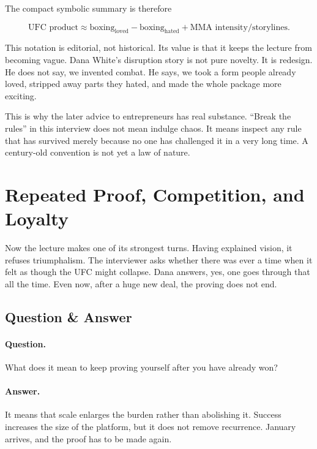 The compact symbolic summary is therefore

\begin{equation}
\text{UFC product}
\approx
\text{boxing}_{\mathrm{loved}}
-
\text{boxing}_{\mathrm{hated}}
+
\text{MMA intensity/storylines}.
\end{equation}

This notation is editorial, not historical. Its value is that it keeps the lecture from becoming vague. Dana White's disruption story is not pure novelty. It is redesign. He does not say, we invented combat. He says, we took a form people already loved, stripped away parts they hated, and made the whole package more exciting.

This is why the later advice to entrepreneurs has real substance. ``Break the rules'' in this interview does not mean indulge chaos. It means inspect any rule that has survived merely because no one has challenged it in a very long time. A century-old convention is not yet a law of nature.

\section{Repeated Proof, Competition, and Loyalty}

Now the lecture makes one of its strongest turns. Having explained vision, it refuses triumphalism. The interviewer asks whether there was ever a time when it felt as though the UFC might collapse. Dana answers, yes, one goes through that all the time. Even now, after a huge new deal, the proving does not end.

\subsection{Question \& Answer}

\paragraph{Question.}
What does it mean to keep proving yourself after you have already won?

\paragraph{Answer.}
It means that scale enlarges the burden rather than abolishing it. Success increases the size of the platform, but it does not remove recurrence. January arrives, and the proof has to be made again.

